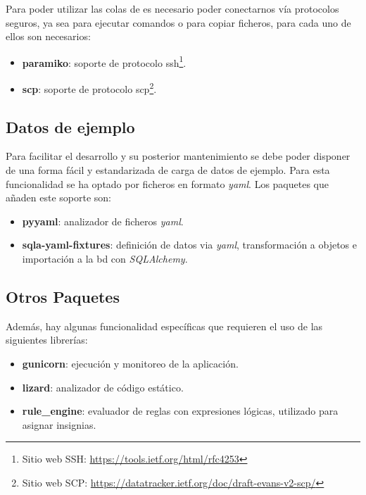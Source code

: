 \documentclass[11pt,spanish,listoffigures,listoftables]{tfgetsinf}
\begin{document}
Para poder utilizar las \Gls{cola}s de \kahan es necesario poder conectarnos vía protocolos seguros, ya sea para ejecutar comandos o para copiar ficheros, para cada uno de ellos son necesarios:

\begin{itemize}
	\item \textbf{paramiko}: soporte de protocolo \acrfull{ssh}\footnote{Sitio web SSH: \url{https://tools.ietf.org/html/rfc4253}}.
	\item \textbf{scp}: soporte de protocolo \acrfull{scp}\footnote{Sitio web SCP: \url{https://datatracker.ietf.org/doc/draft-evans-v2-scp/}}.
\end{itemize}

\subsection{Datos de ejemplo}

Para facilitar el desarrollo y su posterior mantenimiento se debe poder disponer de una forma fácil y estandarizada de carga de datos de ejemplo. Para esta funcionalidad se ha optado por ficheros en formato \textit{yaml}. Los \gls{paquete}s que añaden este soporte son:

\begin{itemize}
    \item \textbf{pyyaml}: analizador de ficheros \textit{yaml}.
	\item \textbf{sqla-yaml-fixtures}: definición de datos via \textit{yaml}, transformación a objetos e importación a la \acrshort{bd} con \textit{SQLAlchemy}.
\end{itemize}

\subsection{Otros Paquetes}

Además, hay algunas funcionalidad específicas que requieren el uso de las siguientes librerías:

\begin{itemize}
	\item \textbf{gunicorn}: ejecución y monitoreo de la aplicación.
	\item \textbf{lizard}: analizador de código estático.
	\item \textbf{rule\_engine}: evaluador de reglas con expresiones lógicas, utilizado para asignar \Gls{insignia}s.
\end{itemize}
\end{document}
